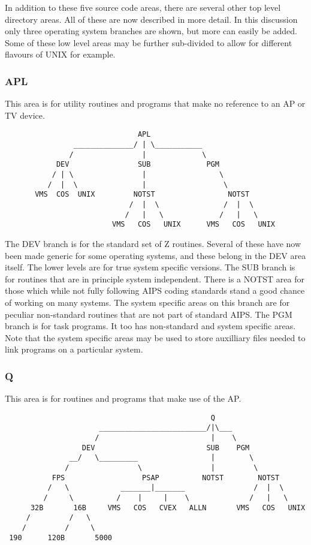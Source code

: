 In addition to these five source code areas, there are several other top
level directory areas. All of these are now described in more detail. In
this discussion only three operating system branches are shown, but more
can easily be added. Some of these low level areas may be further
sub-divided to allow for different flavours of UNIX for example.

\subsubsection{ APL }

This area is for utility routines and programs that make no reference to
an AP or TV device.

\begin{verbatim}
                               APL
                ______________/ | \___________
               /                |             \
            DEV                SUB             PGM
           / | \                |                 \
          /  |  \               |                  \
       VMS  COS  UNIX         NOTST                 NOTST
                             /  |  \               /  |  \
                            /   |   \             /   |   \
                         VMS   COS   UNIX      VMS   COS   UNIX
\end{verbatim}

The DEV branch is for the standard set of Z routines. Several of these
have now been made generic for some operating systems, and these
belong in the DEV area itself. The lower levels are for true system
specific versions. The SUB branch is for routines that are in principle
system independent. There is a NOTST area for those which while not
fully following AIPS coding standards stand a good chance of working on
many systems. The system specific areas on this branch are for peculiar
non-standard routines that are not part of standard AIPS. The PGM branch
is for task programs. It too has non-standard and system specific
areas. Note that the system specific areas may be used to store
auxilliary files needed to link programs on a particular system.

\subsubsection{ Q }

This area is for routines and programs that make use of the AP.

\begin{verbatim}
                                                Q
                      _________________________/|\___
                     /                          |    \
                  DEV                          SUB    PGM
               __/   \_________                 |        \
              /                \                |         \
           FPS                  PSAP          NOTST        NOTST
          /   \            _______|_______                /  |  \
         /     \          /    |     |    \              /   |   \
      32B       16B     VMS   COS   CVEX   ALLN       VMS   COS   UNIX
     /         /   \
    /         /     \
 190      120B       5000
\end{verbatim}


